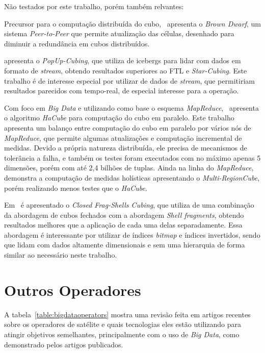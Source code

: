 Não testados por este trabalho, porém também relvantes:

Precursor para o computação distribuída do cubo,~\cite{dokaBrownDwarfFullydistributed2011} apresenta o \textit{Brown Dwarf}, um sistema \textit{Peer-to-Peer} que permite atualização das células, desenhado para diminuir a redundância em cubos distribuídos.

\cite{heinePopUpCubingAlgorithmEfficiently2017} apresenta o \textit{PopUp-Cubing}, que utiliza de icebergs para lidar com dados em formato de \textit{stream}, obtendo resultados superiores ao FTL e \textit{Star-Cubing}.
Este trabalho é de interesse especial por utilizar de dados de \textit{stream}, que permitiriam resultados parecidos com tempo-real, de especial interesse para a operação.

Com foco em \textit{Big Data} e utilizando como base o esquema \textit{MapReduce},~\cite{wangScalableDataCube2013} apresenta o algoritmo \textit{HaCube} para computação do cubo em paralelo.
Este trabalho apresenta um balanço entre computação do cubo em paralelo por vários nós de \textit{MapReduce}, que permite algumas atualizações e computação incremental de medidas.
Devido a própria natureza distribuída, ele precisa de mecanismos de tolerância a falha, e também os testes foram executados com no máximo apenas 5 dimensões, porém com até 2,4 bilhões de tuplas.
Ainda na linha do \textit{MapReduce},~\cite{yangHolisticAlgebraicData2017} demonstra a computação de medidas holísticas apresentando o \textit{Multi-RegionCube}, porém realizando menos testes que o \textit{HaCube}.

Em~\cite{zhaoClosedFragShellsCubing2018} é apresentado o \textit{Closed Frag-Shells Cubing}, que utiliza de uma combinação da abordagem de cubos fechados com a abordagem \textit{Shell fragments}, obtendo resultados melhores que a aplicação de cada uma delas separadamente.
Essa abordagem é interessante por utilizar de índices \textit{bitmap} e índices invertidos, sendo que lidam com dados altamente dimensionais e sem uma hierarquia de forma similar ao necessário neste trabalho.

\section{Outros Operadores}
\label{ch:corr:ops}

A tabela~\ref{table:bigdataoperators} mostra uma revisão feita em artigos recentes sobre os operadores de satélite e quais tecnologias eles estão utilizando para atingir objetivos semelhantes, principalmente com o uso de \textit{Big Data}, como demonstrado pelos artigos publicados.

